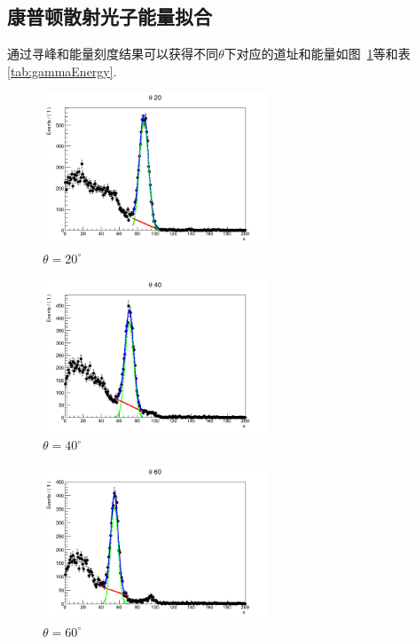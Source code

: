 \documentclass[10pt]{ctexart}
\begin{document}
\subsection{康普顿散射光子能量拟合}
通过寻峰和能量刻度结果可以获得不同$\theta$下对应的道址和能量如图~\ref{fig:theta20}等和表\ref{tab:gammaEnergy}.

\begin{figure}
    \centering
    \includegraphics[width=0.6\textwidth]{data/20.png}
    \caption{$\theta=20^\circ$}
    \label{fig:theta20}
\end{figure}
\begin{figure}
    \centering
    \includegraphics[width=0.6\textwidth]{data/40.png}
    \caption{$\theta=40^\circ$}
    \label{fig:theta40}
\end{figure}
\begin{figure}
    \centering
    \includegraphics[width=0.6\textwidth]{data/60.png}
    \caption{$\theta=60^\circ$}
    \label{fig:theta60}
\end{figure}
\end{document}
